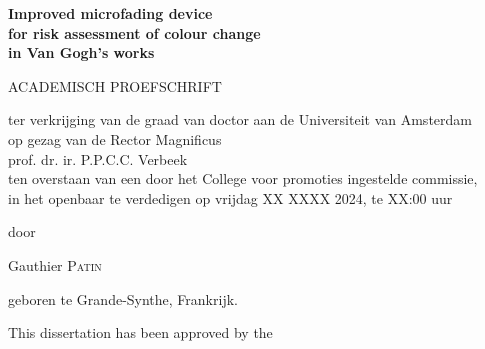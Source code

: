 \begin{titlepage}
\begin{center}
    \vspace*{3cm}

    \textbf{\Huge Improved microfading device}\\
    \vspace{1cm}
    \textbf{\Huge for risk assessment of colour change}\\
    \vspace{1cm}
    \textbf{\Huge in Van Gogh's works}

           
    \vspace{5cm}
    

\vspace*{4\baselineskip}



{\LARGE ACADEMISCH PROEFSCHRIFT}

\medskip
\large
{ter verkrijging van de graad van doctor aan de Universiteit van Amsterdam \\
op gezag van de Rector Magnificus \\
prof. dr. ir. P.P.C.C. Verbeek \\
ten overstaan van een door het College voor promoties ingestelde commissie, \\
in het openbaar te verdedigen op vrijdag XX XXXX 2024, te XX:00 uur \\
}

\medskip

door

\medskip

\makeatletter
{\Large Gauthier {\scshape Patin}}
\makeatother

\medskip

geboren te Grande-Synthe, Frankrijk.

\end{center}
\end{titlepage}


\clearpage
\thispagestyle{empty}
\null%
\label{thesis:committee}
\vfill
{}

\LARGE

\noindent This dissertation has been approved by the

